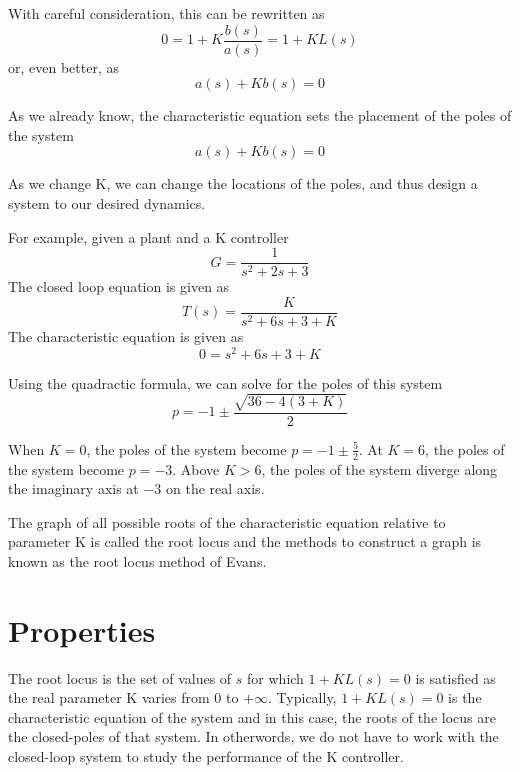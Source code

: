 \documentclass[
]{book}
\theoremstyle{definition}
\theoremstyle{definition}
\theoremstyle{definition}
\theoremstyle{remark}
\begin{document}
With careful consideration, this can be rewritten as
\begin{equation}
0 = 1 + K\frac{b(s)}{a(s)} = 1 + KL(s)
\end{equation}
or, even better, as
\begin{equation}
a(s) + Kb(s) = 0
\end{equation}

As we already know, the characteristic equation sets the placement of the poles of the system
\begin{equation}
a(s) + Kb(s) = 0
\end{equation}

As we change K, we can change the locations of the poles, and thus design a system to our desired dynamics.

For example, given a plant and a K controller
\begin{equation}
G = \frac{1}{s^2+2s+3}
\end{equation}
The closed loop equation is given as
\begin{equation}
T(s) = \frac{K}{s^2+6s+3+K}
\end{equation}
The characteristic equation is given as
\begin{equation}
0 = s^2 + 6s + 3 + K
\end{equation}

Using the quadractic formula, we can solve for the poles of this system
\begin{equation}
p = -1 \pm \frac{\sqrt{36-4\left(3+K\right)}}{2}
\end{equation}

When \(K=0\), the poles of the system become \(p = -1 \pm \frac{5}{2}\). At \(K = 6\), the poles of the system become \(p = -3\). Above \(K>6\), the poles of the system diverge along the imaginary axis at \(-3\) on the real axis.

The graph of all possible roots of the characteristic equation relative to parameter K is called the root locus and the methods to construct a graph is known as the root locus method of Evans.

\hypertarget{properties}{%
\section{Properties}\label{properties}}

The root locus is the set of values of \(s\) for which \(1+KL(s) = 0\) is satisfied as the real parameter K varies from 0 to \(+\infty\). Typically, \(1+KL(s)=0\) is the characteristic equation of the system and in this case, the roots of the locus are the closed-poles of that system. In otherwords, we do not have to work with the closed-loop system to study the performance of the K controller.
\end{document}
